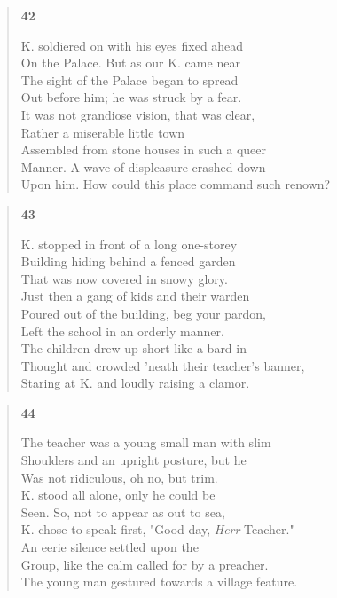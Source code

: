 \documentclass{article}
\begin{document}
\begin{verse}
  \begin{center}
    \textbf{42} \\
  \end{center}
  K. soldiered on with his eyes fixed ahead \\
  On the Palace. But as our K. came near \\
  The sight of the Palace began to spread \\
  Out before him; he was struck by a fear. \\
  It was not grandiose vision, that was clear, \\
  Rather a miserable little town \\
  Assembled from stone houses in such a queer \\
  Manner. A wave of displeasure crashed down \\
  Upon him. How could this place command such renown?
\end{verse}

\begin{verse}
  \begin{center}
    \textbf{43} \\
  \end{center}
  K. stopped in front of a long one-storey \\
  Building hiding behind a fenced garden \\
  That was now covered in snowy glory. \\
  Just then a gang of kids and their warden \\
  Poured out of the building, beg your pardon, \\
  Left the school in an orderly manner. \\
  The children drew up short like a bard in \\
  Thought and crowded 'neath their teacher's banner, \\
  Staring at K. and loudly raising a clamor.
\end{verse}
\newpage
\begin{verse}
  \begin{center}
    \textbf{44} \\
  \end{center}
  The teacher was a young small man with slim \\
  Shoulders and an upright posture, but he \\
  Was not ridiculous, oh no, but trim. \\
  K. stood all alone, only he could be \\
  Seen. So, not to appear as out to sea, \\
  K. chose to speak first, "Good day, \textit{Herr} Teacher." \\
  An eerie silence settled upon the \\
  Group, like the calm called for by a preacher. \\
  The young man gestured towards a village feature.
\end{verse}
\end{document}
